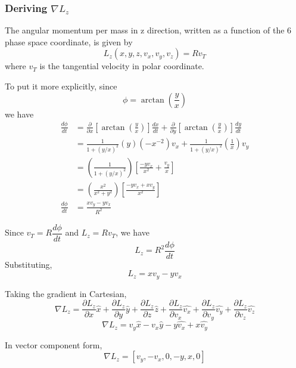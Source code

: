 \documentclass[12pt]{article}
\begin{document}
\subsubsection{Deriving $\nabla L_z$}
The angular momentum per mass in z direction, written as a function of the 6 phase space coordinate, is given by
$$ L_z(x,y,z,v_x,v_y,v_z) = Rv_T $$
where $v_T$ is the tangential velocity in polar coordinate.

To put it more explicitly, since
$$ \phi = \arctan \left( \frac{y}{x} \right) $$
we have
\begin{align*}
\frac{d \phi}{dt} &= \frac{\partial}{\partial x} \left[ \arctan \left( \frac{y}{x} \right) \right] \frac{dx}{dt} + \frac{\partial}{\partial y} \left[ \arctan \left( \frac{y}{x} \right) \right] \frac{dy}{dt} \\
&= \frac{1}{1 + (y/x)^2} (y) (-x^{-2}) v_x + \frac{1}{1 + (y/x)^2} (\frac{1}{x}) v_y \\
&= \left( \frac{1}{1 + (y/x)^2} \right) \left[ \frac{-yv_x}{x^2}+\frac{v_y}{x}
  \right] \\
&= \left( \frac{x^2}{x^2 + y^2} \right) \left[ \frac{-yv_x + xv_y}{x^2} \right] \\
\frac{d \phi}{dt} &= \frac{xv_y - yv_x}{R^2}
\end{align*}

Since $v_T = R\dfrac{d \phi}{dt}$ and $L_z = Rv_T$, we have
$$ L_z = R^2\frac{d \phi}{dt} $$
Substituting,
$$ L_z = xv_y - yv_x $$

Taking the gradient in Cartesian,
$$ \nabla L_z = \frac{\partial L_z}{\partial x} \hat{x} + \frac{\partial L_z}{\partial y} \hat{y} +\frac{\partial L_z}{\partial z} \hat{z} + \frac{\partial L_z}{\partial v_x} \hat{v_x} + \frac{\partial L_z}{\partial v_y} \hat{v_y} + \frac{\partial L_z}{\partial v_z} \hat{v_z} $$
$$ \nabla L_z = v_y \hat{x} - v_x \hat{y} -y \hat{v_x} + x \hat{v_y} $$

In vector component form,
$$ \nabla L_z = [v_y, - v_x , 0, -y, x, 0] $$
\end{document}
